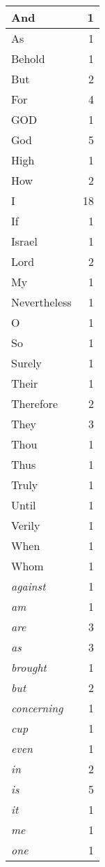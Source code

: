\begin{center}
\begin{longtable}{l|r}
\hline \hline
\endlastfoot
And & 1 \\ \hline
As & 1 \\ \hline
Behold & 1 \\ \hline
But & 2 \\ \hline
For & 4 \\ \hline
GOD & 1 \\ \hline
God & 5 \\ \hline
High & 1 \\ \hline
How & 2 \\ \hline
I & 18 \\ \hline
If & 1 \\ \hline
Israel & 1 \\ \hline
Lord & 2 \\ \hline
My & 1 \\ \hline
Nevertheless & 1 \\ \hline
O & 1 \\ \hline
So & 1 \\ \hline
Surely & 1 \\ \hline
Their & 1 \\ \hline
Therefore & 2 \\ \hline
They & 3 \\ \hline
Thou & 1 \\ \hline
Thus & 1 \\ \hline
Truly & 1 \\ \hline
Until & 1 \\ \hline
Verily & 1 \\ \hline
When & 1 \\ \hline
Whom & 1 \\ \hline
\emph{against} & 1 \\ \hline
\emph{am} & 1 \\ \hline
\emph{are} & 3 \\ \hline
\emph{as} & 3 \\ \hline
\emph{brought} & 1 \\ \hline
\emph{but} & 2 \\ \hline
\emph{concerning} & 1 \\ \hline
\emph{cup} & 1 \\ \hline
\emph{even} & 1 \\ \hline
\emph{in} & 2 \\ \hline
\emph{is} & 5 \\ \hline
\emph{it} & 1 \\ \hline
\emph{me} & 1 \\ \hline
\emph{one} & 1 \\ \hline

\end{longtable}
\end{center}
